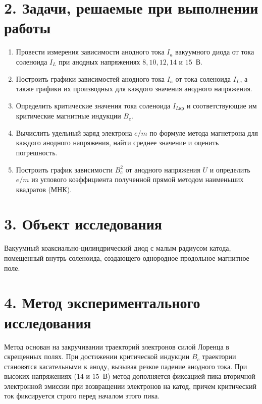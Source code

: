 \documentclass[a4paper,12pt]{article}
\begin{document}
\section*{\hspace{30pt}2. Задачи, решаемые при выполнении работы}
\begin{enumerate}
    \setlength{\itemindent}{15pt}
    \item Провести измерения зависимости анодного тока $I_a$ вакуумного диода от тока соленоида $I_L$ при анодных напряжениях $8, 10, 12, 14$ и $15$~В.
    \item Построить графики зависимостей анодного тока $I_a$ от тока соленоида $I_L$, а также графики их производных для каждого значения анодного напряжения.
    \item Определить критические значения тока соленоида $I_{L\text{кр}}$ и соответствующие им критические магнитные индукции $B_c$.
    \item Вычислить удельный заряд электрона $e/m$ по формуле метода магнетрона для каждого анодного напряжения, найти среднее значение и оценить погрешность.
    \item Построить график зависимости $B_c^2$ от анодного напряжения $U$ и определить $e/m$ из углового коэффициента полученной прямой методом наименьших квадратов (МНК).
\end{enumerate}

\section*{\hspace{30pt}3. Объект исследования}
\hspace{15pt} Вакуумный коаксиально-цилиндрический диод с малым радиусом катода, помещенный внутрь соленоида, создающего однородное продольное магнитное поле.

\section*{\hspace{30pt}4. Метод экспериментального исследования}
\hspace{15pt} Метод основан на закручивании траекторий электронов силой Лоренца в скрещенных полях. При достижении критической индукции $B_c$ траектории становятся касательными к аноду, вызывая резкое падение анодного тока. При высоких напряжениях ($14$ и $15$~В) метод дополняется фиксацией пика вторичной электронной эмиссии при возвращении электронов на катод, причем критический ток фиксируется строго перед началом этого пика.
\end{document}
